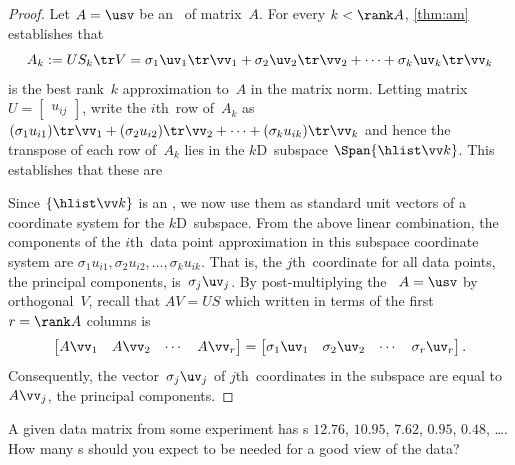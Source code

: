 \begin{proof} 
Let \(A=\usv\) be an \svd\ of matrix~\(A\).
For every \(k<\rank A\), \cref{thm:am} establishes that 
\begin{equation*}
A_k:=US_k\tr V 
=\sigma_1\uv_1\tr\vv_1 +\sigma_2\uv_2\tr\vv_2+\cdots +\sigma_k\uv_k\tr\vv_k
\end{equation*}
is the best rank~\(k\) approximation to~\(A\) in the matrix norm.
Letting matrix \(U=\begin{bmatrix} u_{ij} \end{bmatrix}\), write the \(i\)th~row of~\(A_k\) as
\((\sigma_1u_{i1})\tr\vv_1 +(\sigma_2u_{i2})\tr\vv_2+\cdots +(\sigma_ku_{ik})\tr\vv_k\) and hence the transpose of each row of~\(A_k\) lies in the \(k\)D~subspace \(\Span\{\hlist\vv k\}\).
This establishes that these are 

Since \(\{\hlist\vv k\}\) is an , we now use them as standard unit vectors of a coordinate system for the \(k\)D~subspace.
From the above linear combination, the components of the \(i\)th~data point approximation in this subspace coordinate system are \(\sigma_1u_{i1},\sigma_2u_{i2},\ldots,\sigma_ku_{ik}\).
That is, the \(j\)th~coordinate for all data points, the principal components, is~\(\sigma_j\uv_j\).
By post-multiplying the \svd\ \(A=\usv\) by orthogonal~\(V\), recall that \(AV=US\) which written in terms of the first \(r=\rank A\) columns is
\begin{equation*}
\begin{bmatrix} A\vv_1&A\vv_2&\cdots&A\vv_r \end{bmatrix}
=\begin{bmatrix} \sigma_1\uv_1&\sigma_2\uv_2&\cdots&\sigma_r\uv_r\end{bmatrix} .
\end{equation*}
Consequently, the vector~\(\sigma_j\uv_j\) of \(j\)th~coordinates in the subspace are equal to~\(A\vv_j\), the principal components.
\end{proof}




\begin{activity}
A given data matrix from some experiment has s \(12.76\), \(10.95\), \(7.62\), \(0.95\), \(0.48\), \ldots.  
How many s should you expect to be needed for a good view of the data?
\end{activity}






